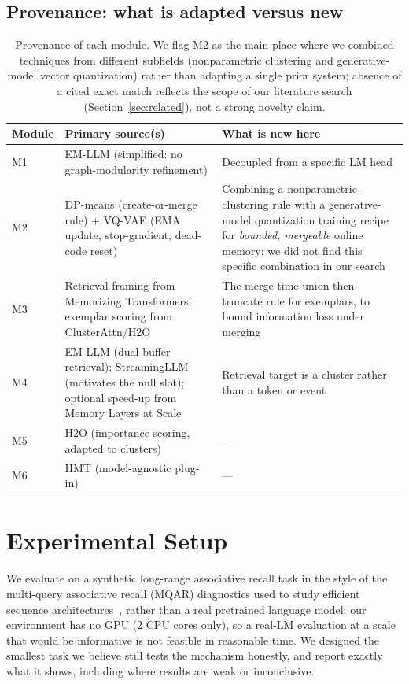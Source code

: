 \documentclass[11pt]{article}
\begin{document}
\subsection{Provenance: what is adapted versus new}
\label{sec:method-summary}

\begin{table}[H]
\centering
\small
\begin{tabular}{p{2.1cm}p{4.6cm}p{4.9cm}}
\toprule
\textbf{Module} & \textbf{Primary source(s)} & \textbf{What is new here} \\
\midrule
M1 & EM-LLM (simplified: no graph-modularity refinement) & Decoupled from a specific LM head \\
M2 & DP-means (create-or-merge rule) + VQ-VAE (EMA update, stop-gradient, dead-code reset) & Combining a nonparametric-clustering rule with a generative-model quantization training
recipe for \emph{bounded, mergeable} online memory; we did not find this specific combination
in our search \\
M3 & Retrieval framing from Memorizing Transformers; exemplar scoring from ClusterAttn/H2O & The
merge-time union-then-truncate rule for exemplars, to bound information loss under merging \\
M4 & EM-LLM (dual-buffer retrieval); StreamingLLM (motivates the null slot); optional speed-up
from Memory Layers at Scale & Retrieval target is a cluster rather than a token or event \\
M5 & H2O (importance scoring, adapted to clusters) & --- \\
M6 & HMT (model-agnostic plug-in) & --- \\
\bottomrule
\end{tabular}
\caption{Provenance of each module. We flag M2 as the main place where we combined techniques
from different subfields (nonparametric clustering and generative-model vector quantization)
rather than adapting a single prior system; absence of a cited exact match reflects the scope of
our literature search (Section~\ref{sec:related}), not a strong novelty claim.}
\label{tab:provenance}
\end{table}

\section{Experimental Setup}
\label{sec:setup}

We evaluate on a synthetic long-range associative recall task in the style of the
multi-query associative recall (MQAR) diagnostics used to study efficient sequence
architectures~\citep{arora2024zoology}, rather than a real pretrained language model: our
environment has no GPU (2 CPU cores only), so a real-LM evaluation at a scale that would be
informative is not feasible in reasonable time. We designed the smallest task we believe still
tests the mechanism honestly, and report exactly what it shows, including where results are
weak or inconclusive.
\end{document}
